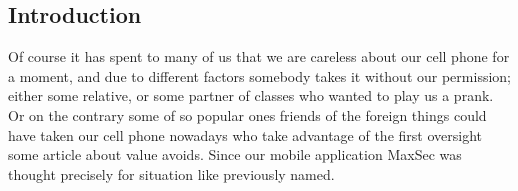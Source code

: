 \documentclass[12pt,letterpaper]{article}
\begin{document}
\subsection{Introduction}
\begin{raggedleft}
Of course it has spent to many of us that we are careless about our cell phone for a moment, and due to different factors somebody takes it without our permission; either some relative, or some partner of classes who wanted to play us a prank. Or on the contrary some of so popular ones friends of the foreign things could have taken our cell phone nowadays who take advantage of the first oversight some article about value avoids.
Since our mobile application MaxSec was thought precisely for situation like previously named.
\end{raggedleft}
\end{document}
